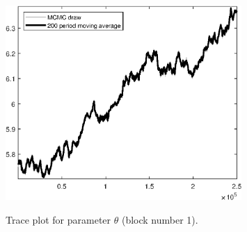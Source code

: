 \begin{figure}[H]
\centering
  \includegraphics[width=0.8\textwidth]{BRS_imp_mobility/graphs/TracePlot_theta_blck_1}\\
    \caption{Trace plot for parameter ${\theta}$ (block number 1).}
\end{figure}
